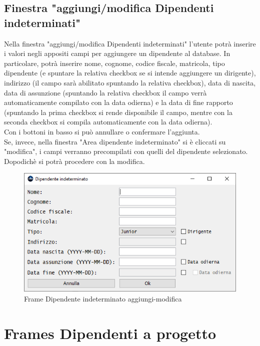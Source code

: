         \subsection {Finestra "aggiungi/modifica Dipendenti indeterminati"}
            Nella finestra "aggiungi/modifica Dipendenti indeterminati" l'utente potrà inserire i valori negli appositi campi per aggiungere un dipendente al database. In particolare, potrà inserire nome, cognome, codice fiscale, matricola, tipo dipendente (e spuntare la relativa checkbox se si intende aggiungere un dirigente), indirizzo (il campo sarà abilitato spuntando la relativa checkbox), data di nascita, data di assunzione (spuntando la relativa checkbox il campo verrà automaticamente compilato con la data odierna) e la data di fine rapporto (spuntando la prima checkbox si rende disponibile il campo, mentre con la seconda checkbox si compila automaticamente con la data odierna).\\
            Con i bottoni in basso si può annullare o confermare l'aggiunta.\\
            Se, invece, nella finestra "Area dipendente indeterminato" si è cliccati su "modifica", i campi verranno precompilati con quelli del dipendente selezionato. Dopodichè si potrà procedere con la modifica.
            \begin{figure}[htbp!]
                \centering
                    \vspace{2\baselineskip}
                    \includegraphics[width=0.6\linewidth]{Immagini/Frames/Frame aggiungi-modifica/Frame Dipendente indeterminato aggiungi-modifica.png}
                \caption{Frame Dipendente indeterminato aggiungi-modifica}
                \label{fig:Frame Dipendente indeterminato aggiungi-modifica}
            \end{figure}

    \newpage

    \section{Frames Dipendenti a progetto}
